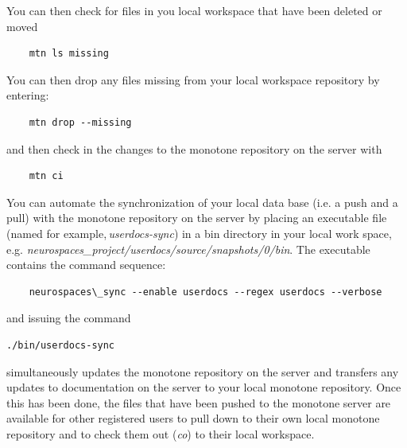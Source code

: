 \documentclass[12pt]{article}
\begin{document}
You can then check for files in you local workspace that have been deleted or moved
\begin{verbatim}
    mtn ls missing
\end{verbatim}
You can then drop any files missing from your local workspace repository by entering:
\begin{verbatim}
    mtn drop --missing
\end{verbatim}
and then check in the changes to the monotone repository on the server with
\begin{verbatim}
    mtn ci
\end{verbatim}
You can automate the synchronization of your local data base (i.e. a push and a pull) with the monotone repository on the server by placing an executable file (named for example,\,{\it userdocs-sync}) in a bin directory in your local work space, e.g. {\it neurospaces\_project/userdocs/source/snapshots/0/bin}. 
The executable contains the command sequence:
\begin{verbatim}
    neurospaces\_sync --enable userdocs --regex userdocs --verbose
\end{verbatim}
and issuing the command
\begin{verbatim}
./bin/userdocs-sync
\end{verbatim}
simultaneously updates the monotone repository on the server and transfers any updates to documentation on the server to your local monotone repository. Once this has been done, the files that have been pushed to the monotone server are available for other registered users to pull down to their own local monotone repository and to check them out ({\it co}) to their local workspace.
\end{document}
